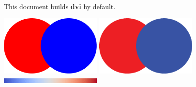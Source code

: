 \documentclass{article}
\begin{document}
\Large
\noindent
This document builds \textbf{\Huge dvi} by default.

\includegraphics[width=2in]{images/Circles_pdf}
\includegraphics[width=2in]{images/Circles_eps}
\includegraphics[width=2in]{images/Cool2WarmBar}
\end{document}
